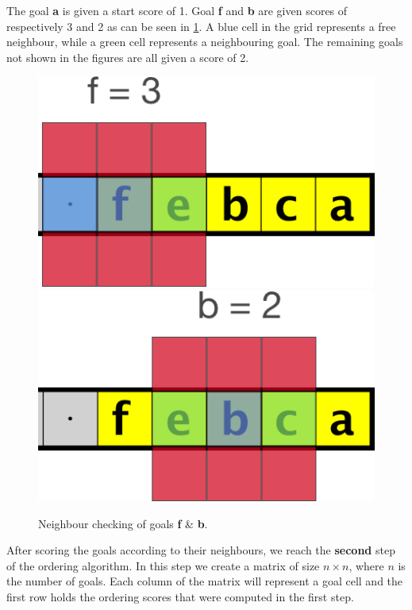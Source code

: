 The goal \textbf{a} is given a start score of 1. 
Goal \textbf{f} and \textbf{b} are given scores of respectively 3 and 2 as can be seen in \cref{fig:grid2}. 
A blue cell in the grid represents a free neighbour, while a green cell represents a neighbouring goal.
The remaining goals not shown in the figures are all given a score of 2. 

\begin{figure}[h!]
  \centering
  \includegraphics[width=.5\columnwidth]{graphics/goal_pri_3.png}
  \includegraphics[width=.5\columnwidth]{graphics/goal_pri_2.png}
  \caption{\label{fig:grid2}Neighbour checking of goals \textbf{f} \& \textbf{b}.}
\end{figure}

After scoring the goals according to their neighbours, we reach the \textbf{second} step of the ordering algorithm. 
In this step we create a matrix of size $n \times n$, where $n$ is the number of goals. 
Each column of the matrix will represent a goal cell and the first row holds the ordering scores that were computed in the first step. 

